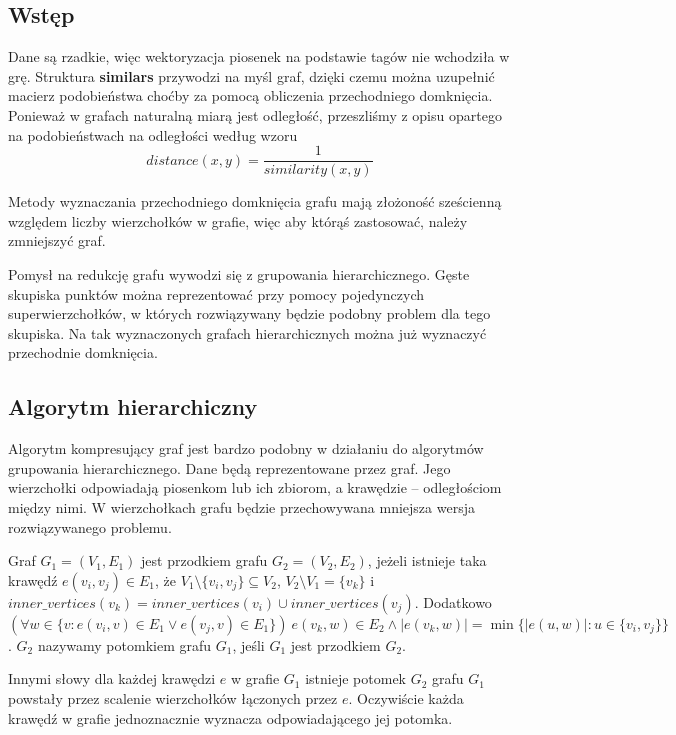 \documentclass[a4paper,10pt]{article}
\begin{document}
\subsection{Wstęp}
Dane są rzadkie, więc wektoryzacja piosenek na podstawie tagów nie wchodziła w grę. 
Struktura \textbf{similars} przywodzi na myśl graf, dzięki czemu można uzupełnić macierz podobieństwa choćby za pomocą obliczenia przechodniego domknięcia.
Ponieważ w grafach naturalną miarą jest odległość, przeszliśmy z opisu opartego na podobieństwach na odległości według wzoru
\begin{equation}
 distance(x, y) = \frac{1}{similarity(x, y)}
\end{equation}

Metody wyznaczania przechodniego domknięcia grafu mają złożoność sześcienną względem liczby wierzchołków w grafie, 
więc aby którąś zastosować, należy zmniejszyć graf.

Pomysł na redukcję grafu wywodzi się z grupowania hierarchicznego.
Gęste skupiska punktów można reprezentować przy pomocy pojedynczych superwierzchołków, w których rozwiązywany będzie podobny problem dla tego skupiska.
Na tak wyznaczonych grafach hierarchicznych można już wyznaczyć przechodnie domknięcia.

\subsection{Algorytm hierarchiczny}
Algorytm kompresujący graf jest bardzo podobny w działaniu do algorytmów grupowania hierarchicznego.
Dane będą reprezentowane przez graf. Jego wierzchołki odpowiadają piosenkom lub ich zbiorom, a krawędzie -- odległościom między nimi.
W wierzchołkach grafu będzie przechowywana mniejsza wersja rozwiązywanego problemu.

Graf $G_1 = (V_1, E_1)$ jest przodkiem grafu $G_2 = (V_2, E_2)$, jeżeli istnieje taka krawędź $e(v_i, v_j) \in E_1$, że $V_1 \setminus \{v_i, v_j\} \subseteq V_2$, 
$V_2 \setminus V_1 = \{v_k\}$ i $inner\_vertices(v_k) = inner\_vertices(v_i) \cup inner\_vertices(v_j)$.\linebreak
Dodatkowo $(\forall w \in \{v: e(v_i, v) \in E_1 \vee e(v_j, v) \in E_1\})~e(v_k, w) \in E_2 \wedge |e(v_k, w)| = \min \{|e(u, w)| : u \in \{v_i, v_j\}\}$.
$G_2$ nazywamy potomkiem grafu $G_1$, jeśli $G_1$ jest przodkiem $G_2$.

Innymi słowy dla każdej krawędzi $e$ w grafie $G_1$ istnieje potomek $G_2$ grafu $G_1$ powstały przez scalenie wierzchołków łączonych przez $e$.
Oczywiście każda krawędź w grafie jednoznacznie wyznacza odpowiadającego jej potomka.
\end{document}
